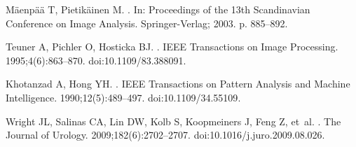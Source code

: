 \documentclass[10pt,letterpaper]{article}
\begin{document}
\begin{thebibliography}{10}
M{\"{a}}enp{\"{a}}{\"{a}} T, Pietik{\"{a}}inen M.
.
\newblock In: Proceedings of the 13th Scandinavian Conference on Image
  Analysis. Springer-Verlag; 2003. p. 885--892.

Teuner A, Pichler O, Hosticka BJ.
.
\newblock IEEE Transactions on Image Processing. 1995;4(6):863--870.
\newblock doi:{10.1109/83.388091}.

Khotanzad A, Hong YH.
.
\newblock IEEE Transactions on Pattern Analysis and Machine Intelligence.
  1990;12(5):489--497.
\newblock doi:{10.1109/34.55109}.

Wright JL, Salinas CA, Lin DW, Kolb S, Koopmeiners J, Feng Z, et~al.
.
\newblock The Journal of Urology. 2009;182(6):2702--2707.
\newblock doi:{10.1016/j.juro.2009.08.026}.

\end{thebibliography}
\end{document}
